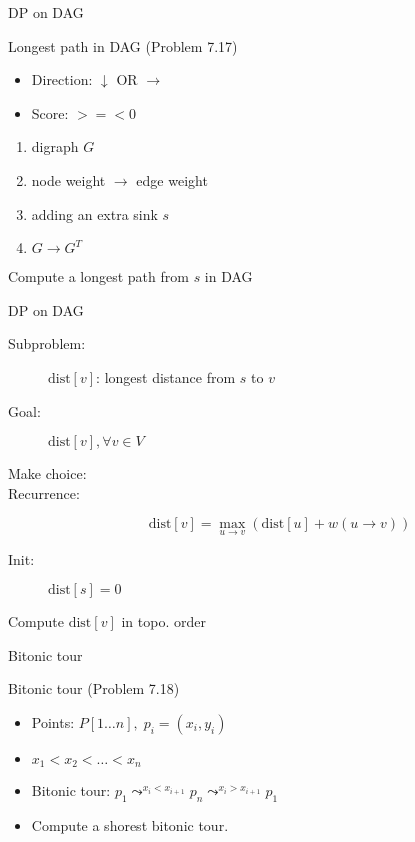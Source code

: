 \begin{frame}{DP on DAG}
  \begin{exampleblock}{Longest path in DAG (Problem 7.17)}
	\begin{itemize}
	  \item Direction: $\downarrow$ OR $\rightarrow$
	  \item Score: $>=< 0$
	\end{itemize}
  \end{exampleblock}

  \pause
  \begin{enumerate}
	\item digraph $G$
	\item node weight $\to$ edge weight
	\item adding an extra sink $s$
	\item $G \to G^{T}$
  \end{enumerate}

  \pause
  \centerline{Compute a longest path from $s$ in DAG}
\end{frame}
\begin{frame}{DP on DAG}
  \begin{description}
	\item[Subproblem:] $\text{dist}[v]$: longest distance from $s$ to $v$ 
	\item[Goal:] $\text{dist}[v], \forall v \in V$
	  \pause
	\item[Make choice:] 
	\item[Recurrence:] 
	  \[
		\text{dist}[v] = \max_{u \to v} \left(\text{dist}[u] + w(u \to v)\right) 
	  \]
	  \pause
	\item[Init:] $\text{dist}[s] = 0$
  \end{description}

  \pause
  \vspace{0.60cm}
  \centerline{Compute $\text{dist}[v]$ in topo. order}
\end{frame}
\begin{frame}{Bitonic tour}
  \begin{exampleblock}{Bitonic tour (Problem 7.18)}
	\begin{itemize}
	  \item Points: $P[1 \dots n], \; p_i = (x_i, y_i)$
	  \item $x_1 < x_2 < \dots < x_n$
	  \item Bitonic tour: $p_1 \leadsto^{x_i < x_{i+1}} p_n \leadsto^{x_i > x_{i+1}} p_1$
	  \item Compute a shorest bitonic tour.
	\end{itemize}
  \end{exampleblock}

\end{frame}
